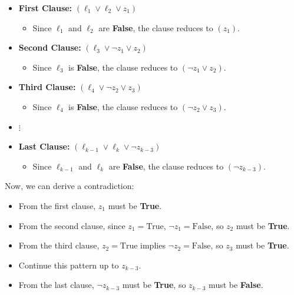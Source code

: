 \documentclass[a4paper]{article}
\begin{document}
\begin{itemize}
    \item \textbf{First Clause:} \( (\ell_1 \lor \ell_2 \lor z_1) \)
        \begin{itemize}
            \item Since \( \ell_1 \) and \( \ell_2 \) are \textbf{False}, the clause reduces to \( (z_1) \).
        \end{itemize}
    \item \textbf{Second Clause:} \( (\ell_3 \lor \neg z_1 \lor z_2) \)
        \begin{itemize}
            \item Since \( \ell_3 \) is \textbf{False}, the clause reduces to \( (\neg z_1 \lor z_2) \).
        \end{itemize}
    \item \textbf{Third Clause:} \( (\ell_4 \lor \neg z_2 \lor z_3) \)
        \begin{itemize}
            \item Since \( \ell_4 \) is \textbf{False}, the clause reduces to \( (\neg z_2 \lor z_3) \).
        \end{itemize}
    \item \(\vdots\)
    \item \textbf{Last Clause:} \( (\ell_{k-1} \lor \ell_k \lor \neg z_{k-3}) \)
        \begin{itemize}
            \item Since \( \ell_{k-1} \) and \( \ell_k \) are \textbf{False}, the clause reduces to \( (\neg z_{k-3}) \).
        \end{itemize}
\end{itemize}

Now, we can derive a contradiction:

\begin{itemize}
    \item From the first clause, \( z_1 \) must be \textbf{True}.
    \item From the second clause, since \( z_1 = \text{True} \), \( \neg z_1 = \text{False} \), so \( z_2 \) must be \textbf{True}.
    \item From the third clause, \( z_2 = \text{True} \) implies \( \neg z_2 = \text{False} \), so \( z_3 \) must be \textbf{True}.
    \item Continue this pattern up to \( z_{k-3} \).
    \item From the last clause, \( \neg z_{k-3} \) must be \textbf{True}, so \( z_{k-3} \) must be \textbf{False}.
\end{itemize}
\end{document}
